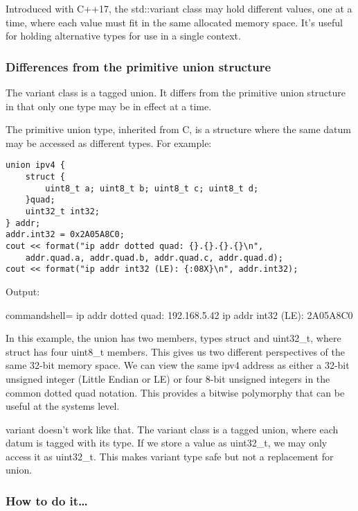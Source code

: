 
Introduced with C++17, the std::variant class may hold different values, one at a time, where each value must fit in the same allocated memory space. It's useful for holding alternative types for use in a single context.

\subsubsection{Differences from the primitive union structure}

The variant class is a tagged union. It differs from the primitive union structure in that only one type may be in effect at a time.

The primitive union type, inherited from C, is a structure where the same datum may be accessed as different types. For example:

\begin{lstlisting}[style=styleCXX]
union ipv4 {
	struct {
		uint8_t a; uint8_t b; uint8_t c; uint8_t d;
	}quad;
	uint32_t int32;
} addr;
addr.int32 = 0x2A05A8C0;
cout << format("ip addr dotted quad: {}.{}.{}.{}\n",
	addr.quad.a, addr.quad.b, addr.quad.c, addr.quad.d);
cout << format("ip addr int32 (LE): {:08X}\n", addr.int32);
\end{lstlisting}

Output:

\begin{tcblisting}{commandshell={}}
ip addr dotted quad: 192.168.5.42
ip addr int32 (LE): 2A05A8C0
\end{tcblisting}

In this example, the union has two members, types struct and uint32\_t, where struct has four uint8\_t members. This gives us two different perspectives of the same 32-bit memory space. We can view the same ipv4 address as either a 32-bit unsigned integer (Little Endian or LE) or four 8-bit unsigned integers in the common dotted quad notation. This provides a bitwise polymorphy that can be useful at the systems level.

variant doesn't work like that. The variant class is a tagged union, where each datum is tagged with its type. If we store a value as uint32\_t, we may only access it as uint32\_t. This makes variant type safe but not a replacement for union.

\subsubsection{How to do it…}

